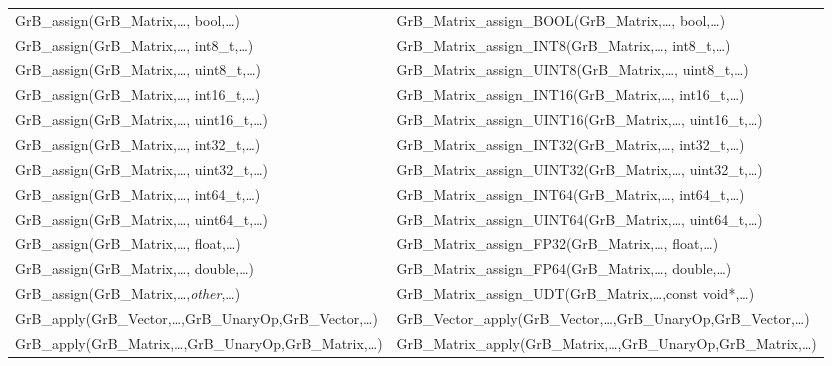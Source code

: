 \begin{table}[htb]
{\begin{tabular}{l|l}
{\sf GrB\_assign(GrB\_Matrix,\ldots, bool,\ldots)}			& {\sf GrB\_Matrix\_assign\_BOOL(GrB\_Matrix,\ldots, bool,\ldots)} \\
{\sf GrB\_assign(GrB\_Matrix,\ldots, int8\_t,\ldots)}		& {\sf GrB\_Matrix\_assign\_INT8(GrB\_Matrix,\ldots, int8\_t,\ldots)} \\
{\sf GrB\_assign(GrB\_Matrix,\ldots, uint8\_t,\ldots)}		& {\sf GrB\_Matrix\_assign\_UINT8(GrB\_Matrix,\ldots, uint8\_t,\ldots)} \\
{\sf GrB\_assign(GrB\_Matrix,\ldots, int16\_t,\ldots)}		& {\sf GrB\_Matrix\_assign\_INT16(GrB\_Matrix,\ldots, int16\_t,\ldots)} \\
{\sf GrB\_assign(GrB\_Matrix,\ldots, uint16\_t,\ldots)}		& {\sf GrB\_Matrix\_assign\_UINT16(GrB\_Matrix,\ldots, uint16\_t,\ldots)} \\
{\sf GrB\_assign(GrB\_Matrix,\ldots, int32\_t,\ldots)}		& {\sf GrB\_Matrix\_assign\_INT32(GrB\_Matrix,\ldots, int32\_t,\ldots)} \\
{\sf GrB\_assign(GrB\_Matrix,\ldots, uint32\_t,\ldots)}		& {\sf GrB\_Matrix\_assign\_UINT32(GrB\_Matrix,\ldots, uint32\_t,\ldots)} \\
{\sf GrB\_assign(GrB\_Matrix,\ldots, int64\_t,\ldots)}		& {\sf GrB\_Matrix\_assign\_INT64(GrB\_Matrix,\ldots, int64\_t,\ldots)} \\
{\sf GrB\_assign(GrB\_Matrix,\ldots, uint64\_t,\ldots)}		& {\sf GrB\_Matrix\_assign\_UINT64(GrB\_Matrix,\ldots, uint64\_t,\ldots)} \\
{\sf GrB\_assign(GrB\_Matrix,\ldots, float,\ldots)}			& {\sf GrB\_Matrix\_assign\_FP32(GrB\_Matrix,\ldots, float,\ldots)} \\
{\sf GrB\_assign(GrB\_Matrix,\ldots, double,\ldots)}		& {\sf GrB\_Matrix\_assign\_FP64(GrB\_Matrix,\ldots, double,\ldots)} \\
{\sf GrB\_assign(GrB\_Matrix,\ldots,\emph{other},\ldots)}	& {\sf GrB\_Matrix\_assign\_UDT(GrB\_Matrix,\ldots,const void*,\ldots)} \\ \hline

{\sf GrB\_apply(GrB\_Vector,\ldots,GrB\_UnaryOp,GrB\_Vector,\ldots)}		& {\sf GrB\_Vector\_apply(GrB\_Vector,\ldots,GrB\_UnaryOp,GrB\_Vector,\ldots)} \\
{\sf GrB\_apply(GrB\_Matrix,\ldots,GrB\_UnaryOp,GrB\_Matrix,\ldots)}		& {\sf GrB\_Matrix\_apply(GrB\_Matrix,\ldots,GrB\_UnaryOp,GrB\_Matrix,\ldots)} \\ \hline
\end{tabular}
}
\label{Tab:NonPolymorphic4a}
\end{table}

